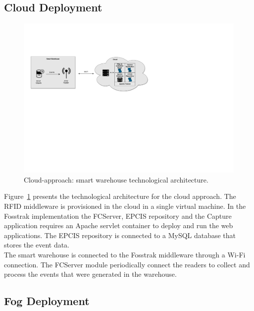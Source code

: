 \subsection{Cloud Deployment}
\label{sub:imp_smart_warehouse_cloud}

\begin{figure}[ht!]
  \centering
  \includegraphics[width=\textwidth]{./images/implementation_cloud_architecture}
  \caption{Cloud-approach: smart warehouse technological architecture.}
  \label{fig:implementation_cloud_architecture}
\end{figure}

Figure~\ref{fig:implementation_cloud_architecture} presents the technological architecture for the cloud
approach. The \gls{RFID} middleware is provisioned in the cloud in a single virtual machine. In the
Fosstrak implementation the \gls{FCServer}, \gls{EPCIS} repository and the Capture application
requires an Apache servlet container to deploy and run the web applications. The \gls{EPCIS}
repository is connected to a MySQL database that stores the event data.\\

The smart warehouse is connected to the Fosstrak middleware through a Wi-Fi connection. The \gls{FCServer}
module periodically connect the readers to collect and process the events that were generated in the
warehouse.

\subsection{Fog Deployment}
\label{sub:imp_smart_warehouse_fog}

